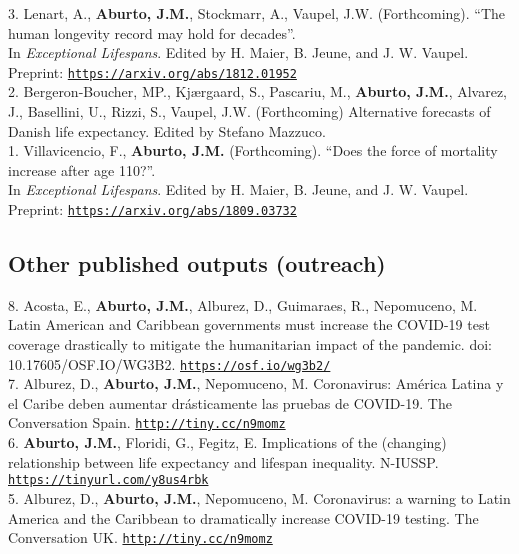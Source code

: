 \documentclass[12pt]{article}
\providecommand*\url[1]{\href{#1}{#1}}
\renewcommand*\url[1]{\href{#1}{\texttt{#1}}}
\begin{document}
3. Lenart, A., \textbf{Aburto, J.M.}, Stockmarr, A., Vaupel, J.W. (Forthcoming). ``The human longevity record may hold for decades''.\\ In \emph{Exceptional Lifespans}. Edited by H. Maier, B. Jeune, and J. W. Vaupel. \\ 
Preprint: \url{https://arxiv.org/abs/1812.01952}\\

2. Bergeron-Boucher, MP., Kj{\ae}rgaard, S.,  Pascariu, M., \textbf{Aburto, J.M.},  Alvarez, J., Basellini, U.,  Rizzi, S., Vaupel, J.W. (Forthcoming) Alternative forecasts of Danish life expectancy. Edited by Stefano Mazzuco.\\

1. Villavicencio, F., \textbf{Aburto, J.M.} (Forthcoming). ``Does the force of mortality increase after age 110?''.\\ In \emph{Exceptional Lifespans}. Edited by H. Maier, B. Jeune, and J. W. Vaupel. \\
Preprint: \url{https://arxiv.org/abs/1809.03732}\\
		  		  
\subsection*{Other published outputs (outreach)}	

8. Acosta, E., \textbf{Aburto, J.M.}, Alburez, D., Guimaraes, R., Nepomuceno, M.  Latin American and Caribbean governments must increase the COVID-19 test coverage drastically to mitigate the humanitarian impact of the pandemic. doi: 10.17605/OSF.IO/WG3B2. \url{https://osf.io/wg3b2/}\\

7. Alburez, D., \textbf{Aburto, J.M.}, Nepomuceno, M. Coronavirus: América Latina y el Caribe deben aumentar drásticamente las pruebas de COVID-19. The Conversation Spain. \url{http://tiny.cc/n9momz}\\

6. \textbf{Aburto, J.M.}, Floridi, G., Fegitz, E. Implications of the (changing) relationship between life expectancy and lifespan inequality. N-IUSSP. \url{https://tinyurl.com/y8us4rbk}\\

5. Alburez, D., \textbf{Aburto, J.M.}, Nepomuceno, M. Coronavirus: a warning to Latin America and the Caribbean to dramatically increase COVID-19 testing. The Conversation UK. \url{http://tiny.cc/n9momz}\\
\end{document}
